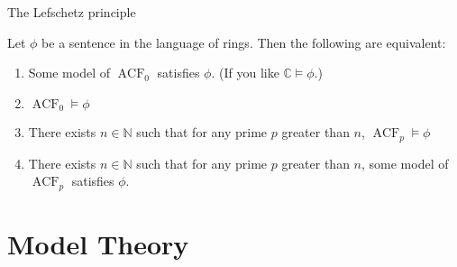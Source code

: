 \documentclass[10pt]{beamer}
\newcommand{\IFF}{\leftrightarrow}
\newcommand{\N}{\mathbb{N}}
\newcommand{\C}{\mathbb{C}}
\newcommand{\<}{\langle}
\renewcommand{\>}{\rangle}
\DeclareMathOperator{\ACF}{ACF}
\newcommand{\link}[1]{\hypertarget{#1}{}}
\begin{document}


\begin{frame}[fragile]{The Lefschetz principle}
  \begin{theorem}
    \link{lefschetz}
    Let $\phi$ be a sentence in the language of rings. %
    Then the following are equivalent:
    \begin{enumerate}[<+->]
        \item Some model of $\ACF_0$ satisfies $\phi$.
        (If you like $\C \vDash \phi$.)
        \item $\ACF_0 \vDash \phi$
        \item There exists $n \in \N$ such that for any prime $p$
            greater than $n$, $\ACF_p \vDash \phi$
        \item There exists $n \in \N$ such that for any prime $p$
        greater than $n$, some model of $\ACF_p$ satisfies $\phi$.
    \end{enumerate}
\end{theorem}
\end{frame}

\section{Model Theory}
\end{document}
